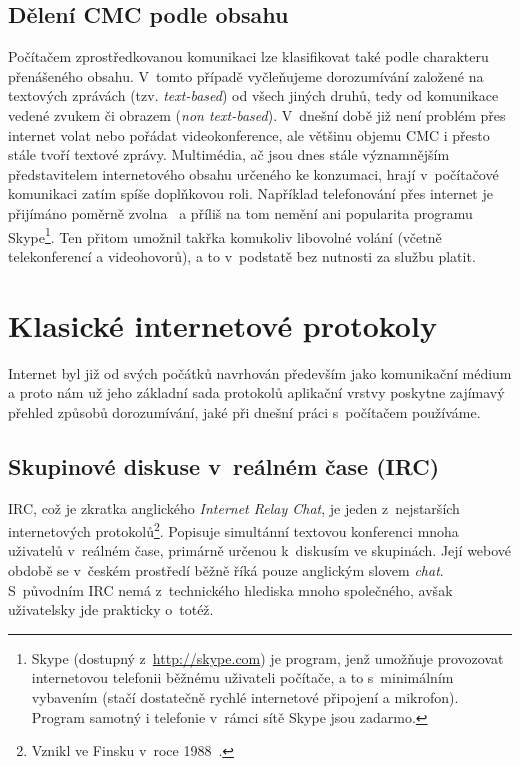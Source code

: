 \documentclass[12pt,oneside,final]{fithesis2}
\begin{document}
\subsection{Dělení CMC podle obsahu}
Počítačem zprostředkovanou komunikaci lze klasifikovat také podle charakteru přenášeného obsahu. V~tomto případě vyčleňujeme dorozumívání založené na textových zprávách (tzv. \emph{text-based}) od všech jiných druhů, tedy od komunikace vedené zvukem či obrazem (\emph{non text-based}). V~dnešní době již není problém přes internet volat nebo pořádat videokonference, ale většinu objemu CMC i přesto stále tvoří textové zprávy. Multimédia, ač jsou dnes stále významnějším představitelem internetového obsahu určeného ke konzumaci, hrají v~počítačové komunikaci zatím spíše doplňkovou roli. Například telefonování přes internet je přijímáno poměrně zvolna~\cite{latif2007adoption} a příliš na tom nemění ani popularita programu Skype\footnote{Skype (dostupný z~\url{http://skype.com}) je program, jenž umožňuje provozovat internetovou telefonii běžnému uživateli počítače, a to s~minimálním vybavením (stačí dostatečně rychlé internetové připojení a mikrofon). Program samotný i telefonie v~rámci sítě Skype jsou zadarmo.}. Ten přitom umožnil takřka komukoliv libovolné volání (včetně telekonferencí a videohovorů), a to v~podstatě bez nutnosti za službu platit.


\section{Klasické internetové protokoly}\label{protocols}
Internet byl již od svých počátků navrhován především jako komunikační médium a proto nám už jeho základní sada protokolů aplikační vrstvy poskytne zajímavý přehled způsobů dorozumívání, jaké při dnešní práci s~počítačem používáme.

\subsection{Skupinové diskuse v~reálném čase (IRC)}\label{irc}
IRC, což je zkratka anglického \emph{Internet Relay Chat}, je jeden z~nejstarších internetových protokolů\footnote{Vznikl ve Finsku v~roce 1988~\cite{oikarinen2011founding}.}. Popisuje simultánní textovou konferenci mnoha uživatelů v~reálném čase, primárně určenou k~diskusím ve skupinách. Její webové obdobě se v~českém prostředí běžně říká pouze anglickým slovem \emph{chat}. S~původním IRC nemá z~technického hlediska mnoho společného, avšak uživatelsky jde prakticky o~totéž.
\end{document}
